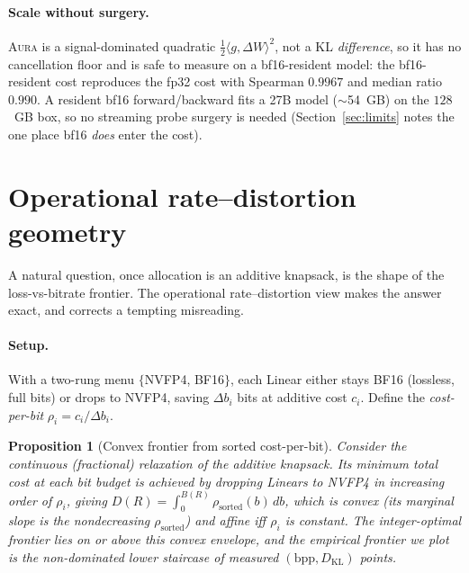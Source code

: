 \documentclass[11pt]{article}
\theoremstyle{plain}
\newtheorem{proposition}[theorem]{Proposition}
\theoremstyle{definition}
\newcommand{\bpp}{\mathrm{bpp}}
\newcommand{\kl}{D_{\mathrm{KL}}}
\newcommand{\dW}{\Delta W}
\begin{document}
\paragraph{Scale without surgery.} \textsc{Aura} is a signal-dominated quadratic
$\tfrac12\langle g,\dW\rangle^2$, not a KL \emph{difference}, so it has no
cancellation floor and is safe to measure on a bf16-resident model: the
bf16-resident cost reproduces the fp32 cost with Spearman $0.9967$ and median
ratio $0.990$. A resident bf16 forward/backward fits a 27B model ($\sim$54~GB)
on the $128$~GB box, so no streaming probe surgery is needed
(Section~\ref{sec:limits} notes the one place bf16 \emph{does} enter the cost).

\section{Operational rate--distortion geometry}\label{sec:rd}

A natural question, once allocation is an additive knapsack, is the shape of the
loss-vs-bitrate frontier. The operational rate--distortion view \cite{ortega1998}
makes the answer exact, and corrects a tempting misreading.

\paragraph{Setup.} With a two-rung menu $\{$NVFP4, BF16$\}$, each Linear either
stays BF16 (lossless, full bits) or drops to NVFP4, saving
$\Delta b_i$ bits at additive cost $c_i$. Define the \emph{cost-per-bit}
$\rho_i = c_i/\Delta b_i$.

\begin{proposition}[Convex frontier from sorted cost-per-bit]
\label{prop:rd}
Consider the \emph{continuous} (fractional) relaxation of the additive knapsack.
Its minimum total cost at each bit budget is achieved by dropping Linears to
NVFP4 in increasing order of $\rho_i$, giving
$D(R)=\int_0^{B(R)}\rho_{\mathrm{sorted}}(b)\,db$, which is convex (its marginal
slope is the nondecreasing $\rho_{\mathrm{sorted}}$) and affine iff $\rho_i$ is
constant. The integer-optimal frontier lies on or above this convex envelope, and
the empirical frontier we plot is the non-dominated lower staircase of measured
$(\bpp,\kl)$ points.
\end{proposition}
\end{document}
